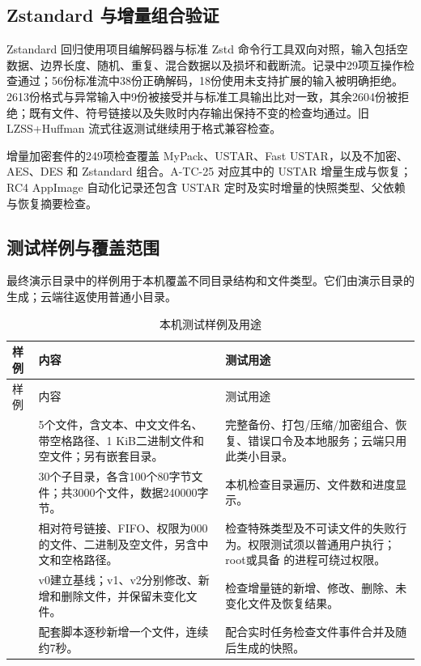 \subsection{Zstandard 与增量组合验证}
Zstandard 回归使用项目编解码器与标准 Zstd 命令行工具双向对照，输入包括空数据、边界长度、随机、重复、混合数据以及损坏和截断流。记录中29项互操作检查通过；56份标准流中38份正确解码，18份使用未支持扩展的输入被明确拒绝。2613份格式与异常输入中9份被接受并与标准工具输出比对一致，其余2604份被拒绝；既有文件、符号链接以及失败时内存输出保持不变的检查均通过。旧 LZSS+Huffman 流式往返测试继续用于格式兼容检查。

增量加密套件的249项检查覆盖 MyPack、USTAR、Fast USTAR，以及不加密、AES、DES 和 Zstandard 组合。A-TC-25 对应其中的 USTAR 增量生成与恢复；RC4 AppImage 自动化记录还包含 USTAR 定时及实时增量的快照类型、父依赖与恢复摘要检查。

\subsection{测试样例与覆盖范围}
最终演示目录中的样例用于本机覆盖不同目录结构和文件类型。它们由演示目录的
 生成；云端往返使用普通小目录。

\begin{longtable}{L{.16\linewidth}L{.39\linewidth}L{.36\linewidth}}
\caption{本机测试样例及用途}\label{tab:final-samples}\\\toprule 样例 & 内容 & 测试用途\\\midrule\endfirsthead
\toprule 样例 & 内容 & 测试用途\\\midrule\endhead
{} & 5个文件，含文本、中文文件名、带空格路径、1 KiB二进制文件和空文件；另有嵌套目录。 & 完整备份、打包/压缩/加密组合、恢复、错误口令及本地服务；云端只用此类小目录。\\
 & 30个子目录，各含100个80字节文件；共3000个文件，数据240000字节。 & 本机检查目录遍历、文件数和进度显示。\\
 & 相对符号链接、FIFO、权限为000的文件、二进制及空文件，另含中文和空格路径。 & 检查特殊类型及不可读文件的失败行为。权限测试须以普通用户执行；root或具备  的进程可绕过权限。\\
 & v0建立基线；v1、v2分别修改、新增和删除文件，并保留未变化文件。 & 检查增量链的新增、修改、删除、未变化文件及恢复结果。\\
 & 配套脚本逐秒新增一个文件，连续约7秒。 & 配合实时任务检查文件事件合并及随后生成的快照。\\
\bottomrule\end{longtable}

